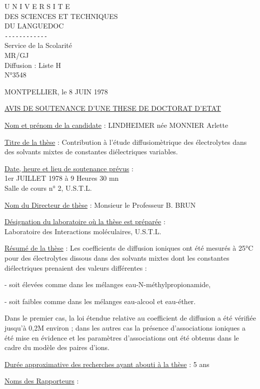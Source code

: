 U N I V E R S I T E\\
DES SCIENCES ET TECHNIQUES\\
DU LANGUEDOC\\
\texttt{-{}-{}-{}-{}-{}-{}-{}-{}-{}-{}-{}-}\\
Service de la Scolarité\\
MR/GJ\\
Diffusion : Liste H\\
N°3548

MONTPELLIER, le 8 JUIN 1978

\uline{AVIS DE SOUTENANCE D'UNE THESE DE DOCTORAT D'ETAT}

\uline{Nom et prénom de la candidate} : LINDHEIMER née MONNIER Arlette

\uline{Titre de la thèse} : Contribution à l'étude diffusiomètrique des électrolytes dans des solvants mixtes de constantes diélectriques variables.

\uline{Date, heure et lieu de soutenance prévus} :\\
1er JUILLET 1978 à 9 Heures 30 mn\\
Salle de cours n° 2, U.S.T.L.

\uline{Nom du Directeur de thèse} : Monsieur le Professeur B. BRUN

\uline{Désignation du laboratoire où la thèse est préparée} :\\
Laboratoire des Interactions moléculaires, U.S.T.L.

\uline{Résumé de la thèse} : Les coefficients de diffusion ioniques ont été mesurés à 25°C pour des électrolytes dissous dans des solvants mixtes dont les constantes diélectriques prenaient des valeurs différentes :

- soit élevées comme dans les mélanges eau-N-méthylpropionamide,

- soit faibles comme dans les mélanges eau-alcool et eau-éther.

Dans le premier cas, la loi étendue relative au coefficient de diffusion a été vérifiée jusqu'à 0,2M environ ; dans les autres cas la présence d'associations ioniques a été mise en évidence et les paramètres d'associations ont été obtenus dans le cadre du modèle des paires d'ions.

\uline{Durée approximative des recherches ayant abouti à la thèse} : 5 ans

\uline{Noms des Rapporteurs} :


